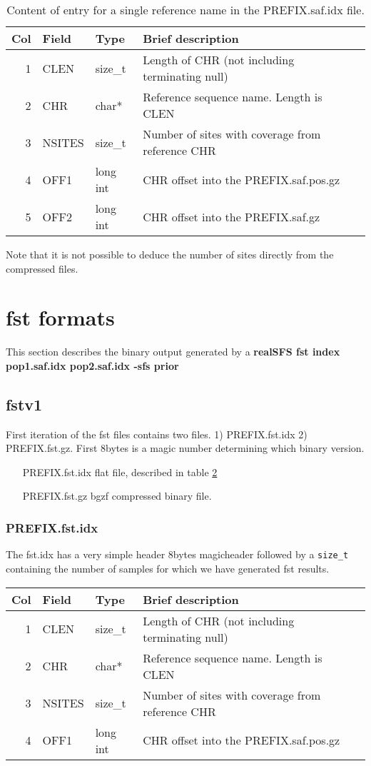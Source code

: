\documentclass[10pt]{article}
\begin{document}
\begin{table}
\begin{tabular}{rllll}
  \hline
  {\bf Col} & {\bf Field} & {\bf Type} & {\bf Brief description} \\
  \hline
  1 & {\sf CLEN} & size\_t &  Length of CHR (not including terminating null)\\
  2 & {\sf CHR} & char* & Reference sequence name. Length is CLEN\\
  3 & {\sf NSITES} & size\_t & Number of sites with coverage from reference CHR\\
  4 & {\sf OFF1} & long int & CHR offset into the PREFIX.saf.pos.gz \\
  5 & {\sf OFF2} & long int & CHR offset into the PREFIX.saf.gz \\
  \hline
\end{tabular}\label{tab1}
\caption{Content of entry for a single reference name in the PREFIX.saf.idx file.}
\end{table}
 Note that it is not possible to deduce the number of sites directly from the compressed files.
\clearpage
\section{fst formats}
This section describes the binary output generated by a \textbf{realSFS fst index pop1.saf.idx pop2.saf.idx -sfs prior}
\subsection{fstv1}

First iteration of the fst files contains two files. 1) PREFIX.fst.idx 2) PREFIX.fst.gz.
First 8bytes is a magic number determining which binary version.


\begin{itemize}
\item[PREFIX.fst.idx] flat file, described in table \ref{tab2}
\item[PREFIX.fst.gz] bgzf compressed binary file.
\end{itemize}
\subsubsection{PREFIX.fst.idx}
The fst.idx has a very simple header 8bytes magicheader followed by a \texttt{size\_t} containing the number of samples for which we have generated fst results.
\begin{table}[h]
\begin{tabular}{rllll}
  \hline
  {\bf Col} & {\bf Field} & {\bf Type} & {\bf Brief description} \\
  \hline
  1 & {\sf CLEN} & size\_t &  Length of CHR (not including terminating null)\\
  2 & {\sf CHR} & char* & Reference sequence name. Length is CLEN\\
  3 & {\sf NSITES} & size\_t & Number of sites with coverage from reference CHR\\
  4 & {\sf OFF1} & long int & CHR offset into the PREFIX.saf.pos.gz \\
  \hline
\end{tabular}\label{tab2}
\end{table}
\end{document}
